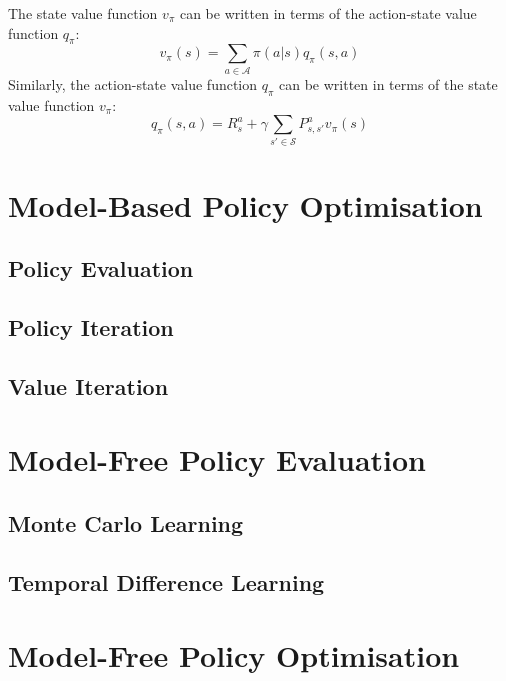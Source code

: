\documentclass{article}
\begin{document}
The state value function $ v_{\pi} $ can be written in terms of the action-state value function $ q_{\pi} $:
\[ v_{\pi}(s) = \sum_{a \in \mathcal{A}} \pi(a | s)q_{\pi}(s,a) \]
Similarly, the action-state value function $ q_{\pi} $ can be written in terms of the state value function $ v_{\pi} $:
\[ q_{\pi}(s,a) = R_s^a + \gamma \sum_{s' \in \mathcal{S}} P_{s,s'}^a v_{\pi}(s) \]

\section{Model-Based Policy Optimisation}

\subsection{Policy Evaluation}


\subsection{Policy Iteration}

\subsection{Value Iteration}

\section{Model-Free Policy Evaluation}

\subsection{Monte Carlo Learning}

\subsection{Temporal Difference Learning}

\section{Model-Free Policy Optimisation}
\end{document}
